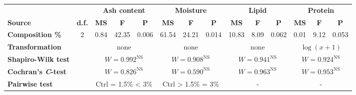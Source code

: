 \begin{tabular}{l@{\hspace{1ex}}ccccccccccccc}
	\toprule
		 &  & \multicolumn{3}{c}{\textbf{Ash content}} & \multicolumn{3}{c}{\textbf{Moisture}} & \multicolumn{3}{c}{\textbf{Lipid}} & \multicolumn{3}{c}{\textbf{Protein}} \\[\spheader]
		\textbf{Source} & \textbf{d.f.} & \textbf{MS} & \textbf{F} & \textbf{P} & \textbf{MS} & \textbf{F} & \textbf{P} & \textbf{MS} & \textbf{F} & \textbf{P} & \textbf{MS} & \textbf{F} & \textbf{P} \\
	\midrule
		\textbf{Composition \%} & \num{2} & \num{0,84} & \num{42.35} & \num{0.006} & \num{61.54} & \num{24,21} & \num{0,014} & \num{10.83} & \num{8.09} & \num{0.062} & \num{0.01} & \num{9.12} & \num{0.053} \\[\spbtwrowsA]
		\textbf{Transformation} &  & \multicolumn{3}{c}{none} & \multicolumn{3}{c}{none}& \multicolumn{3}{c}{none}& \multicolumn{3}{c}{$ \log (x + 1) $} \\[\spbtwrowsA]
		\textbf{Shapiro-Wilk test} &  & \multicolumn{3}{c}{$ W = \num{0,992}^{\text{NS}} $} & \multicolumn{3}{c}{$ W = \num{0,908}^{\text{NS}} $} & \multicolumn{3}{c}{$ W = \num{0,941}^{\text{NS}} $} & \multicolumn{3}{c}{$ W = \num{0,924}^{\text{NS}} $} \\[\spbtwrowsA]
		\textbf{Cochran's \emph{C}-test} &  & \multicolumn{3}{c}{$ W = \num{0,826}^{\text{NS}} $} & \multicolumn{3}{c}{$ W = \num{0,590}^{\text{NS}} $} & \multicolumn{3}{c}{$ W = \num{0,963}^{\text{NS}} $} & \multicolumn{3}{c}{$ W = \num{0,953}^{\text{NS}} $} \\[\spbtwrowsA]
		\textbf{Pairwise test} &  & \multicolumn{3}{c}{Ctrl = \num{1.5}\% < 3\%} & \multicolumn{3}{c}{Ctrl > \num{1.5}\% = \num{3}\%}& \multicolumn{3}{c}{-}& \multicolumn{3}{c}{-} \\
	\bottomrule
\end{tabular}